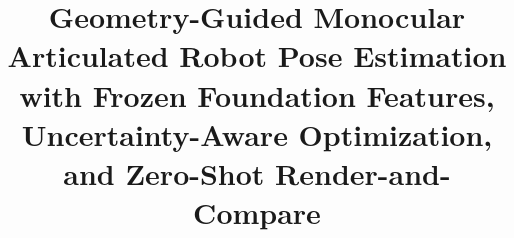 
\title{Geometry-Guided Monocular Articulated Robot Pose Estimation with Frozen Foundation Features, Uncertainty-Aware Optimization, and Zero-Shot Render-and-Compare}

